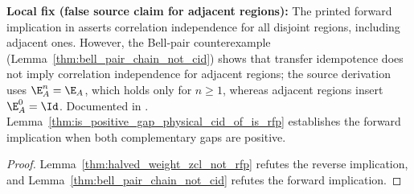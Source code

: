 \begin{lemma}
    \textbf{Local fix (false source claim for adjacent regions):}
    The printed forward implication in \cite[Theorem~3.8]{Cirac2016MPDO_arXiv}
    asserts correlation independence for all disjoint regions, including adjacent
    ones. However, the Bell-pair counterexample (Lemma~\ref{thm:bell_pair_chain_not_cid})
    shows that transfer idempotence does not imply correlation independence for adjacent
    regions; the source derivation uses $\E_A^n=\E_A$, which holds only for $n\ge1$,
    whereas adjacent regions insert $\E_A^0=\Id$. Documented in
    \cite{gap:cpsv16_pure_zcl_adjacent_gap_cid_scope}.
    Lemma~\ref{thm:is_positive_gap_physical_cid_of_is_rfp} establishes the
    forward implication when both complementary gaps are positive.
\end{lemma}
\begin{proof}
    Lemma~\ref{thm:halved_weight_zcl_not_rfp} refutes the reverse implication,
    and Lemma~\ref{thm:bell_pair_chain_not_cid} refutes the forward
    implication.
\end{proof}

